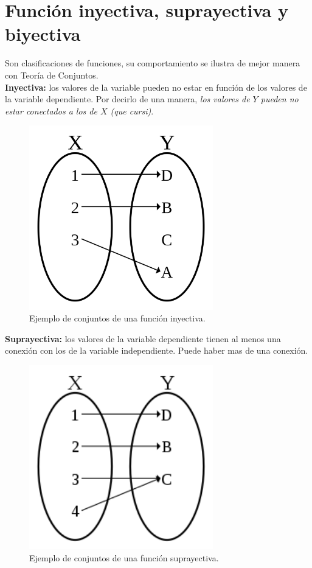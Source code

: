 \documentclass[letterpaper, 12pt]{article}
\begin{document}
        \section{Función inyectiva, suprayectiva y biyectiva}
        Son clasificaciones de funciones, su comportamiento se ilustra de mejor manera con Teoría de Conjuntos.
        \\\newline\textbf{Inyectiva: }los valores de la variable pueden no estar en función de los valores de la variable dependiente. Por decirlo de una manera, \emph{los valores de \(Y\) pueden no estar conectados a los de \(X\) (que cursi)}.
        \begin{figure}[H]
            \centering
            \includegraphics[width=8cm]{inyective.png}
            \caption{Ejemplo de conjuntos de una función inyectiva.}
        \end{figure} 
        \textbf{Suprayectiva: }los valores de la variable dependiente tienen al menos una conexión con los de la variable independiente. Puede haber mas de una conexión.
        \begin{figure}[H]
            \centering
            \includegraphics[width=8cm]{surjective.png}
            \caption{Ejemplo de conjuntos de una función suprayectiva.}
        \end{figure}
\end{document}
